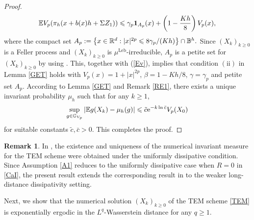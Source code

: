 \documentclass[aap]{imsart}
\theoremstyle{plain}
\theoremstyle{definition}
\newtheorem{remark}{Remark}
\begin{document}
\begin{proof}
\begin{equation}
			\mathbb{E}V_p(\pi_h(x+b(x)h+\Sigma Z_1)) \leqslant \gamma_p{\bf 1}_{A_p}(x)+\left(1-\frac{Kh}{8}\right) V_p(x),
		\end{equation}
		where the compact set %
		$A_p := \left\{x\in\mathbb{R}^d: |x|^{2p}\leqslant 8\gamma_p/(Kh)\right\}\cap\mathbb{B}^h.$ 
		Since $(X_k)_{k\geqslant 0}$ is a Feller process and $(X_k)_{k\geqslant 0}$ is $\mu^{\mathrm{Leb}}$-irreducible, $A_p$ is a petite set for $(X_k)_{k\geqslant 0}$ by using \cite[Proposition 6.2.8]{Meyn}.
		This, together with (\ref{Ev}), implies that condition $(\mathrm{ii})$ in Lemma \ref{GET} holds with $V_p(x) = 1+|x|^{2p}$, $\beta = 1-Kh/8$, $\gamma = \gamma_p$ and petite set $A_p$. 
		According to Lemma \ref{GET} and Remark \ref{RE1}, there exists a unique invariant probability $\mu_h$ such that for any $k\geqslant 1$,
		$$
		\sup_{g\in \mathbb{G}_{V_p}}|\mathbb{E} g(X_k)-\mu_h(g)|\leqslant \tilde{c} \mathrm{e}^{-k\ln \bar{c}}V_p(X_0)$$
		for suitable constants $\tilde{c},\bar{c}>0$. This completes the proof.
	\end{proof}
\begin{remark}
	In \cite{IMA}, the existence and uniqueness of the numerical invariant measure for the TEM scheme were obtained under the uniformly dissipative condition. Since Assumption \ref{A1} reduces to the uniformly dissipative case when \(R=0\) in \eqref{CaI}, the present result extends the corresponding result in \cite{IMA} to the weaker long-distance dissipativity setting.
\end{remark}

Next, we show that the numerical solution \((X_k)_{k\geqslant0}\) of the TEM scheme \eqref{TEM} is exponentially ergodic in the \(L^q\)-Wasserstein distance for any \(q\geqslant1\).
\end{document}
